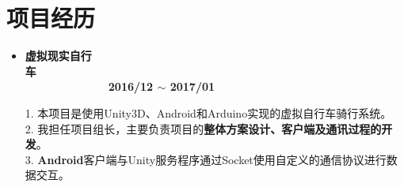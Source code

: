 \documentclass[letterpaper, UTF8, 11pt]{article}
\begin{document}
	\section*{\textbf{项目经历}}\vspace{-0.15in}
	\begin{itemize}	
		\item \textbf{虚拟现实自行车}~~~~~~~~~~~~~~~~~~~~~~~~~~~~~~~~~~~~~~~~~~~~~~~~~~~~~~~~~~~~~~~~~~~~~~~~~~~~~~~~~\textbf{2016/12 $\sim$ 2017/01}
		
		1. 本项目是使用Unity3D、Android和Arduino实现的虚拟自行车骑行系统。\\
		2. 我担任项目组长，主要负责项目的\textbf{整体方案设计、客户端及通讯过程的开发}。\\
		3. \textbf{Android}客户端与Unity服务程序通过Socket使用自定义的通信协议进行数据交互。
		\vspace{0.01in}
		
		

\end{itemize}
\end{document}
